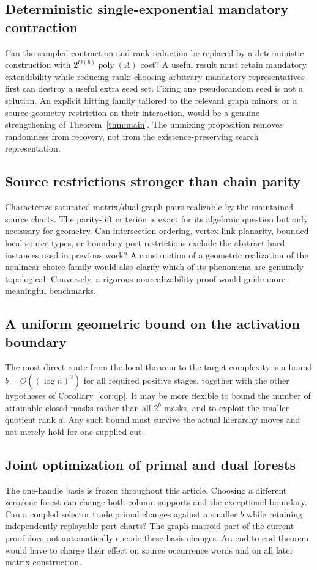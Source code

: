 \documentclass[11pt,letterpaper]{article}
\theoremstyle{definition}
\newcommand{\poly}{\operatorname{poly}}
\begin{document}
\subsection{Deterministic single-exponential mandatory contraction}
Can the sampled contraction and rank reduction be replaced by a deterministic
construction with $2^{O(b)}\poly(\Lambda)$ cost? A useful result must retain
mandatory extendibility while reducing rank; choosing arbitrary mandatory
representatives first can destroy a useful extra seed set. Fixing one
pseudorandom seed is not a solution. An explicit hitting family tailored to
the relevant graph minors, or a source-geometry restriction on their
interaction, would be a genuine strengthening of Theorem~\ref{thm:main}.
The unmixing proposition removes randomness from recovery, not from the
existence-preserving search representation.

\subsection{Source restrictions stronger than chain parity}
Characterize saturated matrix/dual-graph pairs realizable by the maintained
source charts. The parity-lift criterion is exact for its algebraic question
but only necessary for geometry. Can intersection ordering, vertex-link
planarity, bounded local source types, or boundary-port restrictions exclude
the abstract hard instances used in previous work? A construction of a
geometric realization of the nonlinear choice family would also clarify
which of its phenomena are genuinely topological. Conversely, a rigorous
nonrealizability proof would guide more meaningful benchmarks.

\subsection{A uniform geometric bound on the activation boundary}
The most direct route from the local theorem to the target complexity is a
bound $b=O((\log n)^2)$ for all required positive stages, together with the
other hypotheses of Corollary~\ref{cor:qp}. It may be more flexible to bound
the number of attainable closed masks rather than all $2^b$ masks, and to
exploit the smaller quotient rank $d$. Any such bound must survive the actual
hierarchy moves and not merely hold for one supplied cut.

\subsection{Joint optimization of primal and dual forests}
The one-handle basis is frozen throughout this article. Choosing a different
zero/one forest can change both column supports and the exceptional boundary.
Can a coupled selector trade primal changes against a smaller $b$ while
retaining independently replayable port charts? The graph-matroid part of
the current proof does not automatically encode these basis changes.
An end-to-end theorem would have to charge their effect on source occurrence
words and on all later matrix construction.
\end{document}
